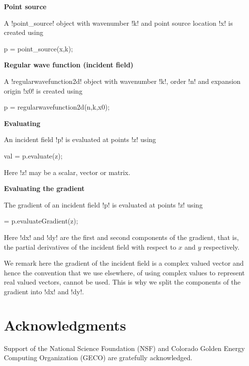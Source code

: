 \documentclass[12pt,letterpaper,final]{article}
\newcommand{\techheading}[1]{%
    \par\vspace{-0.3\parskip}\noindent\hspace{-1cm}\textbf{#1}%
    \par\vspace{-0.5\parskip}\noindent\nopagebreak\ignorespaces}
\begin{document}
\techheading{Point source}
A !point_source! object with wavenumber !k! and point source location !x!
is created using
\begin{matlab}
p = point_source(x,k);
\end{matlab}

\techheading{Regular wave function (incident field)}
A !regularwavefunction2d! object with wavenumber !k!, order !n!
and expansion origin !x0! is created using
\begin{matlab}
p = regularwavefunction2d(n,k,x0);
\end{matlab}

\techheading{Evaluating}
An incident field !p! is evaluated at points !z! using
\begin{matlab}
val = p.evaluate(z);
\end{matlab}
Here !z! may be a scalar, vector or matrix.

\techheading{Evaluating the gradient}
The gradient of an incident field !p!
is evaluated at points !z! using
\begin{matlab}
[dx,dy] = p.evaluateGradient(z);
\end{matlab}
Here !dx! and !dy! are the first and second components of the gradient,
that is, the partial derivatives of the incident field with respect to
$x$ and $y$ respectively.

We remark here the gradient of the incident field is a complex valued vector 
and hence the convention that we use elsewhere,
of using complex values to represent real valued vectors, cannot be used.
This is why we split the components of the gradient into !dx! and !dy!.


\section*{Acknowledgments}
Support of the National Science Foundation (NSF) and
Colorado Golden Energy Computing Organization (GECO) are gratefully acknowledged.


\end{document}

